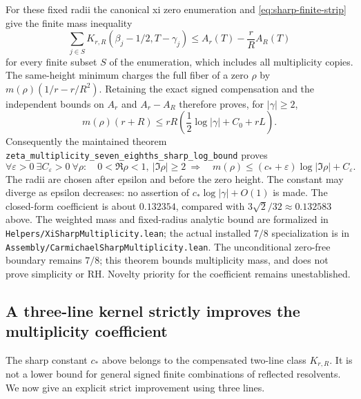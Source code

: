 For these fixed radii the canonical xi zero enumeration and
\eqref{eq:sharp-finite-strip} give the finite mass inequality
\[
 \sum_{j\in S}K_{r,R}(\beta_j-1/2,T-\gamma_j)
 \le A_r(T)-\frac rR A_R(T)
\]
for every finite subset \(S\) of the enumeration, which includes all
multiplicity copies. The same-height minimum charges the full fiber
of a zero \(\rho\) by \(m(\rho)(1/r-r/R^2)\). Retaining the exact signed
compensation and the independent bounds on \(A_r\) and \(A_r-A_R\)
therefore proves, for \(|\gamma|\ge2\),
\[
 m(\rho)(r+R)
 \le rR\left(\frac12\log|\gamma|+C_0+rL\right).
\]
Consequently the maintained theorem
\texttt{zeta\_multiplicity\_seven\_eighths\_sharp\_log\_bound} proves
\begin{equation}\label{eq:sharp-global-multiplicity}
 \forall\varepsilon>0\ \exists C_\varepsilon>0\ \forall\rho:
 \quad 0<\Re\rho<1,\ |\Im\rho|\ge2
 \ \Longrightarrow\quad
 m(\rho)\le(c_*+\varepsilon)\log|\Im\rho|+C_\varepsilon.
\end{equation}
The radii are chosen after epsilon and before the zero height. The
constant may diverge as epsilon decreases: no assertion of
\(c_*\log|\gamma|+O(1)\) is made. The closed-form coefficient is about
\(0.132354\), compared with \(3\sqrt2/32\approx0.132583\) above.
The weighted mass and fixed-radius analytic bound are formalized in
\texttt{Helpers/XiSharpMultiplicity.lean}; the actual installed \(7/8\)
specialization is in \texttt{Assembly/CarmichaelSharpMultiplicity.lean}.
The unconditional zero-free boundary remains \(7/8\); this theorem
bounds multiplicity mass, and does not prove simplicity or RH.
Novelty priority for the coefficient remains unestablished.

\subsection{A three-line kernel strictly improves the multiplicity coefficient}
\label{sec:three-line-multiplicity}

The sharp constant \(c_*\) above belongs to the compensated two-line
class \(K_{r,R}\). It is not a lower bound for general signed finite
combinations of reflected resolvents. We now give an explicit strict
improvement using three lines.

